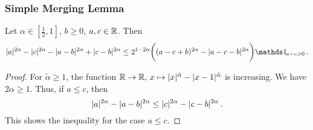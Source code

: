 \subsubsection{Simple Merging Lemma}
%
\begin{lemma}\label{lmm:merging:simple}
	Let $\alpha\in[\frac12,1]$, $b\geq0$, $a,c\in\mathbb{R}$.
	Then
	\begin{equation*}
		|a|^{2\alpha}-|c|^{2\alpha}-|a-b|^{2\alpha}+|c-b|^{2\alpha} \leq 
		2^{1-2\alpha} \bigg(
							(a-c + b)^{2\alpha}  -  |a-c - b|^{2\alpha}
						\bigg) \indOf{a-c>0}
		\eqfs
	\end{equation*}
\end{lemma}
%
\begin{proof}
	For $\tilde \alpha\geq 1$, the function $\mathbb{R}\to\mathbb{R},\, x\mapsto |x|^{\tilde\alpha}-|x-1|^{\tilde\alpha}$ is increasing.
	We have $2\alpha\geq1$. Thus, if $a\leq c$, then
	\begin{equation*}
		|a|^{2\alpha}-|a-b|^{2\alpha}\leq |c|^{2\alpha}-|c-b|^{2\alpha} 
		\, .
	\end{equation*}
	This shows the inequality for the case $a\leq c$.
	

\end{proof}

